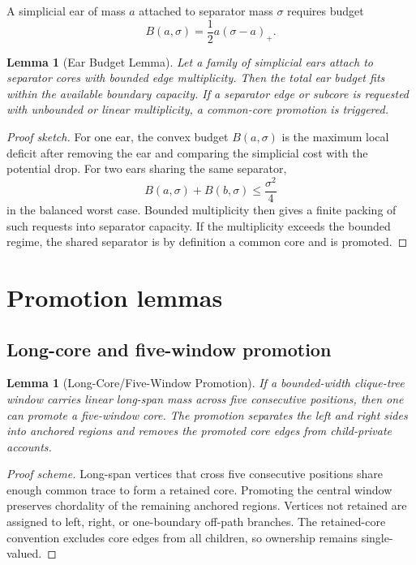 \documentclass[11pt]{article}
\newtheorem{lemma}[theorem]{Lemma}
\theoremstyle{definition}
\begin{document}
A simplicial ear of mass \(a\) attached to separator mass \(\sigma\) requires budget
\[
    B(a,\sigma)=\frac12a(\sigma-a)_+.
\]

\begin{lemma}[Ear Budget Lemma]\label{lem:ear-budget}
Let a family of simplicial ears attach to separator cores with bounded edge multiplicity. Then the total ear budget fits within the available boundary capacity. If a separator edge or subcore is requested with unbounded or linear multiplicity, a common-core promotion is triggered.
\end{lemma}

\begin{proof}[Proof sketch]
For one ear, the convex budget \(B(a,\sigma)\) is the maximum local deficit after removing the ear and comparing the simplicial cost with the potential drop. For two ears sharing the same separator,
\[
    B(a,\sigma)+B(b,\sigma)\le \frac{\sigma^2}{4}
\]
in the balanced worst case. Bounded multiplicity then gives a finite packing of such requests into separator capacity. If the multiplicity exceeds the bounded regime, the shared separator is by definition a common core and is promoted.
\end{proof}

\section{Promotion lemmas}

\subsection{Long-core and five-window promotion}

\begin{lemma}[Long-Core/Five-Window Promotion]\label{lem:long-core}
If a bounded-width clique-tree window carries linear long-span mass across five consecutive positions, then one can promote a five-window core. The promotion separates the left and right sides into anchored regions and removes the promoted core edges from child-private accounts.
\end{lemma}

\begin{proof}[Proof scheme]
Long-span vertices that cross five consecutive positions share enough common trace to form a retained core. Promoting the central window preserves chordality of the remaining anchored regions. Vertices not retained are assigned to left, right, or one-boundary off-path branches. The retained-core convention excludes core edges from all children, so ownership remains single-valued.
\end{proof}
\end{document}
